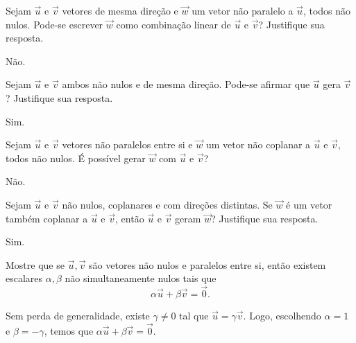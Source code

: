 \begin{exer}
  Sejam $\vec{u}$ e $\vec{v}$ vetores de mesma direção e $\vec{w}$ um vetor não paralelo a $\vec{u}$, todos não nulos. Pode-se escrever $\vec{w}$ como combinação linear de $\vec{u}$ e $\vec{v}$? Justifique sua resposta.
\end{exer}
\begin{resp}
  Não.
\end{resp}

\begin{exer}
  Sejam $\vec{u}$ e $\vec{v}$ ambos não nulos e de mesma direção. Pode-se afirmar que $\vec{u}$ gera $\vec{v}$? Justifique sua resposta.
\end{exer}
\begin{resp}
  Sim.
\end{resp}

\begin{exer}
  Sejam $\vec{u}$ e $\vec{v}$ vetores não paralelos entre si e $\vec{w}$ um vetor não coplanar a $\vec{u}$ e $\vec{v}$, todos não nulos. É possível gerar $\vec{w}$ com $\vec{u}$ e $\vec{v}$?
\end{exer}
\begin{resp}
  Não.
\end{resp}

\begin{exer}
  Sejam $\vec{u}$ e $\vec{v}$ não nulos, coplanares e com direções distintas. Se $\vec{w}$ é um vetor também coplanar a $\vec{u}$ e $\vec{v}$, então $\vec{u}$ e $\vec{v}$ geram $\vec{w}$? Justifique sua resposta.
\end{exer}
\begin{resp}
  Sim.
\end{resp}

\begin{exer}\label{cap_base_sec_comblin:exer:parallel_comblin_ntrivial}
  Mostre que se $\vec{u},\vec{v}$ são vetores não nulos e paralelos entre si, então existem escalares $\alpha,\beta$ não simultaneamente nulos tais que
  \begin{equation}
    \alpha\vec{u} + \beta\vec{v} = \vec{0}.
  \end{equation}
\end{exer}
\begin{resp}
  Sem perda de generalidade, existe $\gamma\neq 0$ tal que $\vec{u} = \gamma\vec{v}$. Logo, escolhendo $\alpha = 1$ e $\beta = -\gamma$, temos que $\alpha\vec{u} + \beta\vec{v} = \vec{0}$.
\end{resp}

